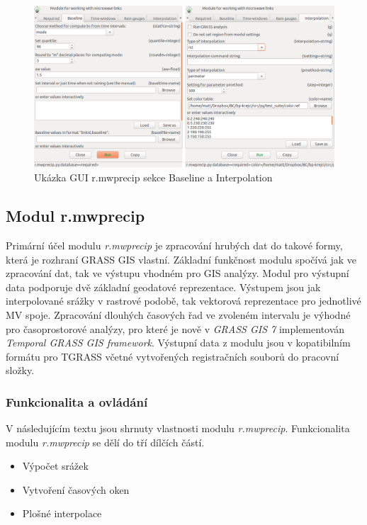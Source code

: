 \documentclass[a4paper,12pt,oneside]{report}
\begin{document}
\begin{figure}[h!]
    \centering
    \includegraphics[width=\textwidth]{./img/grass/gui.png}
    \caption[GUI modul]{Ukázka GUI r.mwprecip sekce Baseline a Interpolation  \centering  }
        \label{fig:baseline}
 \end{figure}

\subsection{Modul r.mwprecip}
Primární účel  modulu \textit{r.mwprecip} je zpracování hrubých dat do takové formy, která je rozhraní GRASS GIS vlastní. Základní funkčnost modulu spočívá jak ve zpracování dat, tak ve výstupu vhodném pro GIS analýzy. Modul pro výstupní data podporuje dvě základní geodatové reprezentace. Výstupem jsou jak interpolované srážky v rastrové podobě, tak vektorová reprezentace pro jednotlivé MV spoje. 
Zpracování dlouhých časových řad ve zvoleném intervalu je výhodné pro časoprostorové analýzy, pro které je nově v \textit{GRASS GIS 7} implementován \textit{Temporal GRASS GIS framework}. Výstupní data z modulu jsou v kopatibilním formátu pro TGRASS včetné vytvořených registračních souborů do pracovní složky.

 
\subsubsection{Funkcionalita a ovládání}
V následujícím textu jsou shrnuty vlastnosti modulu \textit{r.mwprecip}. Funkcionalita modulu \textit{r.mwprecip} se dělí do tří dílčích částí.

\begin{itemize}
\item Výpočet srážek
\item Vytvoření časových oken
\item Plošné interpolace 
\end{itemize}
\end{document}
